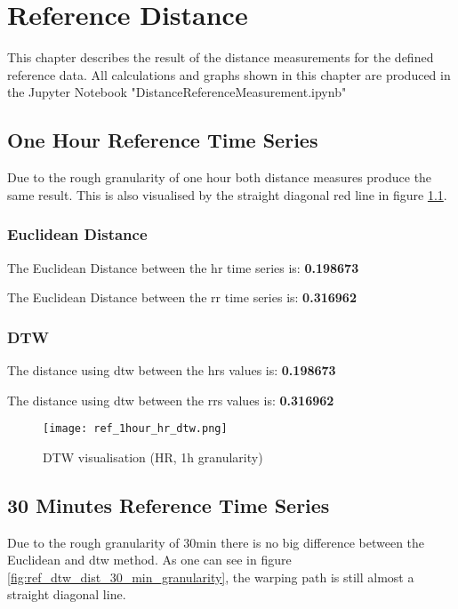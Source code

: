 \chapter{Reference Distance}

This chapter describes the result of the distance measurements for the defined reference data. All calculations and graphs shown in this chapter are produced in the Jupyter Notebook "DistanceReferenceMeasurement.ipynb"

\section{One Hour Reference Time Series}

Due to the rough granularity of one hour both distance measures produce the same result. This is also visualised by the straight diagonal red line in figure \ref{fig:ref_dtw_dist_one_h_granularity}.

\subsection{Euclidean Distance}

The Euclidean Distance between the \ac{hr} time series is: \textbf{0.198673}


The Euclidean Distance between the \ac{rr} time series is: \textbf{0.316962}


\subsection{DTW}

The distance using \ac{dtw} between the \acp{hr} values is: \textbf{0.198673}


The distance using \ac{dtw} between the \acp{rr} values is: \textbf{0.316962}

\begin{figure}[h!]
	\texttt{[image: ref\_1hour\_hr\_dtw.png]}
	\caption{DTW visualisation (HR, 1h granularity)}
	\label{fig:ref_dtw_dist_one_h_granularity}
\end{figure}




\clearpage
\section{30 Minutes Reference Time Series}

Due to the rough granularity of 30min there is no big difference between the Euclidean and \ac{dtw} method. As one can see in figure \ref{fig:ref_dtw_dist_30_min_granularity}, the warping path is still almost a straight diagonal line.

